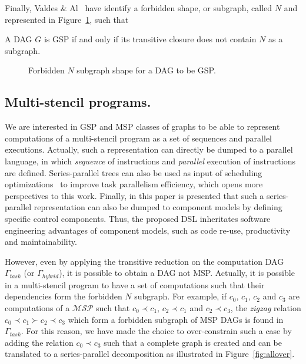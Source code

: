 Finally, Valdes \& Al~\cite{Valdes:1979:RSP:800135.804393} have identify a forbidden shape, or subgraph, called $N$ and represented in Figure~\ref{fig:n}, such that 

\begin{myth}
A DAG $G$ is GSP if and only if its transitive closure does not contain $N$ as a subgraph.
\end{myth}

\begin{figure}[h!]
\begin{center}
  \caption{Forbidden $N$ subgraph shape for a DAG to be GSP.}
  \label{fig:n}
\end{center}
\end{figure}

\subsection{Multi-stencil programs.}
We are interested in GSP and MSP classes of graphs to be able to represent computations of a multi-stencil program as a set of sequences and parallel executions. Actually, such a representation can directly be dumped to a parallel language, in which \emph{sequence} of instructions and \emph{parallel} execution of instructions are defined. Series-parallel trees can also be used as input of scheduling optimizations~\cite{Finta1996323,Wang20082684} to improve task parallelism efficiency, which opens more perspectives to this work. Finally, in this paper is presented that such a series-parallel representation can also be dumped to component models by defining specific control components. Thus, the proposed DSL inheritates software engineering advantages of component models, such as code re-use, productivity and maintainability.

However, even by applying the transitive reduction on the computation DAG $\Gamma_{task}$ (or $\Gamma_{hybrid}$), it is possible to obtain a DAG not MSP. Actually, it is possible in a multi-stencil program to have a set of computations such that their dependencies form the forbidden $N$ subgraph. For example, if $c_0$, $c_1$, $c_2$ and $c_3$ are computations of a $\mathcal{MSP}$ such that $c_0 \prec c_1$, $c_2 \prec c_1$ and $c_2 \prec c_3$, the \emph{zigzag} relation $c_0 \prec c_1 \succ c_2 \prec c_3$ which form a forbidden subgraph of MSP DAGs is found in $\Gamma_{task}$. For this reason, we have made the choice to over-constrain such a case by adding the relation $c_0 \prec c_3$ such that a complete graph is created and can be translated to a series-parallel decomposition as illustrated in Figure~\ref{fig:allover}.

